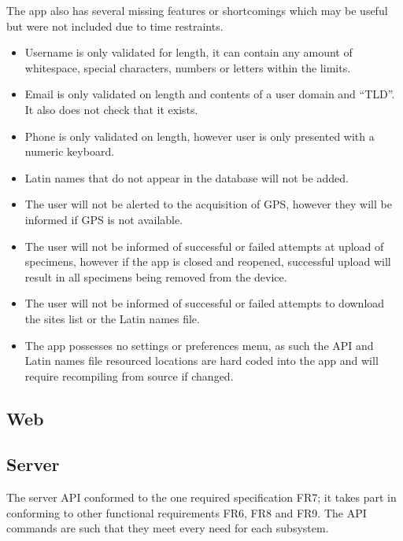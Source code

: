     The app also has several missing features or shortcomings which may be useful but were not included due to time restraints. 
    \begin{itemize}
        \item Username is only validated for length, it can contain any amount of whitespace, special characters, numbers or letters within the limits.
        \item Email is only validated on length and contents of a user domain and ``TLD''. It also does not check that it exists.
        \item Phone is only validated on length, however user is only presented with a numeric keyboard.
        \item Latin names that do not appear in the database will not be added.
        \item The user will not be alerted to the acquisition of GPS, however they will be informed if GPS is not available. 
        \item The user will not be informed of successful or failed attempts at upload of specimens, however if the app is closed and reopened, successful upload will result in all specimens being removed from the device. 
        \item The user will not be informed of successful or failed attempts to download the sites list or the Latin names file.
        \item The app possesses no settings or preferences menu, as such the API and Latin names file resourced locations are hard coded into the app and will require recompiling from source if changed.
    \end{itemize}



\subsection{Web}





\subsection{Server}
 
The server API conformed to the one required specification FR7; it takes part in conforming to other functional requirements FR6, FR8 and FR9. The API commands are such that they meet every need for each subsystem. 